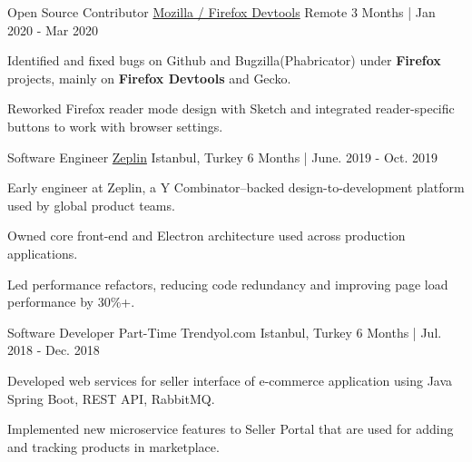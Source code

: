 \begin{cventries}
  \cvopenentry
   {Open Source Contributor} %
    {\href{https://www.mozilla.org}{Mozilla / Firefox Devtools}} %
    {Remote} %
    {3 Months | Jan 2020 - Mar 2020} %
    {
      \begin{cvitems} %
        \item {Identified and fixed bugs on Github and Bugzilla(Phabricator) under \textbf{Firefox} projects, mainly on \textbf{Firefox Devtools} and Gecko.}
        \item {Reworked Firefox reader mode design with Sketch and integrated reader-specific buttons to work with browser settings.}
      \end{cvitems}
    }

  \cvopenentry
   {Software Engineer} %
    {\href{https://zeplin.io}{Zeplin}} %
    {Istanbul, Turkey} %
    {6 Months | June. 2019 - Oct. 2019} %
    {
      \begin{cvitems} %
        \item {Early engineer at Zeplin, a Y Combinator–backed design-to-development platform used by global product teams.}
		\item {Owned core front-end and Electron architecture used across production applications.}
        \item {Led performance refactors, reducing code redundancy and improving page load performance by 30\%+.}
      \end{cvitems}
    }

      \cvopenentry
   {Software Developer Part-Time} %
    {Trendyol.com} %
    {Istanbul, Turkey} %
    {6 Months | Jul. 2018 - Dec. 2018} %
    {
      \begin{cvitems} %
		 \item {Developed web services for seller interface of e-commerce application using Java Spring Boot, REST API, RabbitMQ.}
        \item {Implemented new microservice features to Seller Portal that are used for adding and tracking products in marketplace.}
      \end{cvitems}
    }
\end{cventries}

